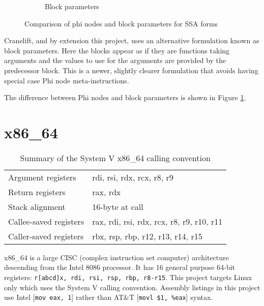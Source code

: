 \begin{figure}
\begin{subfigure}[b]{0.5\textwidth}

        \caption{Block parameters}

    \end{subfigure}
    \caption{Comparison of phi nodes and block parameters for SSA forms}
    \label{fig:phi-bp}
\end{figure}

Cranelift, and by extension this project, uses an alternative formulation known as block
parameters.
Here the blocks appear as if they are functions taking arguments and the values to use for the
arguments are provided by the predecessor block. This is a newer, slightly clearer formulation that
avoids having special case Phi node meta-instructions.

The difference between Phi nodes and block parameters is shown in Figure \ref{fig:phi-bp}.
\section{x86\_64}

\begin{table}[h]
    \centering

    \begin{tabular}{ll}\toprule
        Argument registers     & rdi, rsi, rdx, rcx, r8, r9                \\
        Return registers       & rax, rdx                                  \\
        Stack alignment        & 16-byte at call                           \\
        Callee-saved registers & rax, rdi, rsi, rdx, rcx, r8, r9, r10, r11 \\
        Caller-saved registers & rbx, rsp, rbp, r12, r13, r14, r15         \\
        \bottomrule
    \end{tabular}

    \caption{Summary of the System V x86\_64 calling convention}
    \label{table:systemv}

\end{table}

x86\_64 is a large CISC (complex instruction set computer) architecture descending from the Intel
8086 processor.
It has 16 general purpose 64-bit registers: \texttt{r[abcd]x, rdi, rsi, rsp, rbp, r8-r15}.
This
project targets Linux only which uses the System V
calling convention. Assembly listings in this project use Intel
    [\texttt{mov eax, 1}] rather than AT\&T [\texttt{movl
    \$1, \%eax}] syntax.

